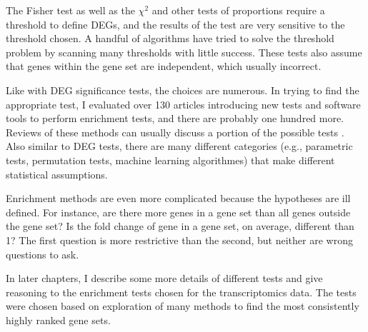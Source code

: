 The Fisher test as well as the $\chi^2$ and other tests of proportions
require a threshold to define DEGs, and the results of the test are
very sensitive to the threshold chosen. A handful of algorithms have
tried to solve the threshold problem by scanning many thresholds
with little success. These tests also assume that genes within the
gene set are independent, which usually incorrect.

Like with DEG significance tests, the choices are numerous.
In trying to find the appropriate test, I evaluated over 130 articles
introducing new tests and software tools to perform enrichment tests, and there
are probably one hundred more.
Reviews of these methods can usually discuss a portion of 
the possible tests \cite{Ackermann:2009bw,Huang:2009be,Abatangelo:2009cc,
Berg:2009tu,Dinu:2008tv}.
Also similar to DEG tests, there are many different categories (e.g., 
parametric tests, permutation tests, machine learning algorithmes)
that make different statistical assumptions.

Enrichment methods are even more complicated because the hypotheses
are ill defined. For instance, are there more genes in a gene set
than all genes outside the gene set? Is the fold change of gene
in a gene set, on average, different than 1? The first question
is more restrictive than the second, but neither are wrong questions
to ask.

In later chapters, I describe some more details of different tests
and give reasoning to the enrichment tests chosen for
the transcriptomics data. The tests were chosen based on exploration
of many methods to find the most consistently highly ranked
gene sets. 













